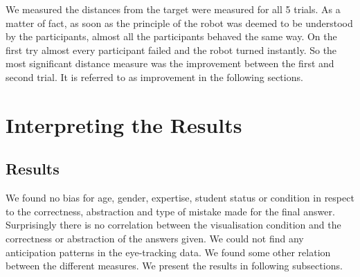 \documentclass{sig-alternate}
\begin{document}
We measured the distances from the target were measured for all 5 trials. As
a matter of fact, as soon as the principle of the robot was deemed to be
understood by the participants, almost all the participants behaved the
same way. On the first try almost every participant failed and the robot
turned instantly. So the most significant distance measure was the
improvement between the first and second trial. It is referred to as
improvement in the following sections.

%
%
%
%
%


\section{Interpreting the Results}
\label{interpretation}

\subsection{Results}

We found no bias for age, gender, expertise, student status or condition
in respect to the correctness, abstraction and type of mistake made for
the final answer. Surprisingly there is no correlation between the
visualisation condition and the correctness or abstraction of the
answers given. We could not find any anticipation patterns in the
eye-tracking data. We found some other relation between the different
measures. We present the results in following subsections.
\end{document}

